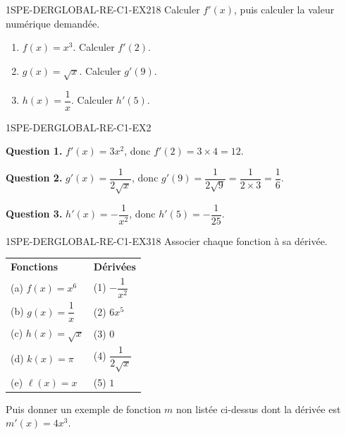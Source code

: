 
\begin{exercice}{1SPE-DERGLOBAL-RE-C1-EX2}{1}{8}
Calculer $f'(x)$, puis calculer la valeur numérique demandée.
\begin{enumerate}
  \item $f(x) = x^3$. Calculer $f'(2)$.
  \item $g(x) = \sqrt{x}$. Calculer $g'(9)$.
  \item $h(x) = \dfrac{1}{x}$. Calculer $h'(5)$.
\end{enumerate}
\end{exercice}


\begin{corrige}{1SPE-DERGLOBAL-RE-C1-EX2}

\textbf{Question 1.} $f'(x) = 3x^2$, donc $f'(2) = 3 \times 4 = 12.$

\textbf{Question 2.} $g'(x) = \dfrac{1}{2\sqrt{x}}$, donc $g'(9) = \dfrac{1}{2\sqrt{9}} = \dfrac{1}{2 \times 3} = \dfrac{1}{6}.$

\textbf{Question 3.} $h'(x) = -\dfrac{1}{x^2}$, donc $h'(5) = -\dfrac{1}{25}.$

\end{corrige}


\begin{exercice}{1SPE-DERGLOBAL-RE-C1-EX3}{1}{8}
Associer chaque fonction à sa dérivée.

\medskip
\begin{center}
\begin{tabular}{ll}
\textbf{Fonctions} & \textbf{Dérivées} \\
(a) $f(x) = x^6$ & (1) $-\dfrac{1}{x^2}$ \\[6pt]
(b) $g(x) = \dfrac{1}{x}$ & (2) $6x^5$ \\[6pt]
(c) $h(x) = \sqrt{x}$ & (3) $0$ \\[6pt]
(d) $k(x) = \pi$ & (4) $\dfrac{1}{2\sqrt{x}}$ \\[6pt]
(e) $\ell(x) = x$ & (5) $1$ \\
\end{tabular}
\end{center}

Puis donner un exemple de fonction $m$ non listée ci-dessus dont la dérivée est $m'(x) = 4x^3$.
\end{exercice}

